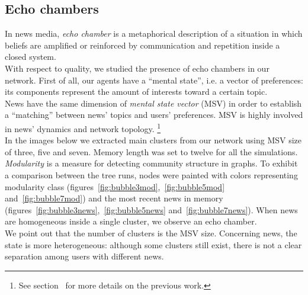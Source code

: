 \subsection{Echo chambers}
In news media, \textit{echo chamber} is a metaphorical description
of a situation in which beliefs are amplified or reinforced by
communication and repetition inside a closed
system.\cite{echochamwiki,echocham}\\
With respect to quality, we studied the presence of echo chambers
in our network.
First of all, our agents have a ``mental  state'', i.e. a vector of
preferences: its components represent the amount of interests toward
a certain topic.\\
News have the same dimension of \textit{mental state vector} (MSV)
in order to establish a ``matching'' between news' topics and users'
preferences.
MSV is highly involved in news' dynamics and network topology.
\footnote{See section~ for more
  details on the previous work.}\\
In the images below we extracted main clusters from our network using
MSV size of three, five and seven.
Memory length was set to twelve for all the simulations.\\
\textit{Modularity} is a measure for detecting community
structure in graphs.\cite{modulwiki}
To exhibit a comparison between the tree runs,
nodes were painted with colors representing modularity class
(figures~\ref{fig:bubble3mod},~\ref{fig:bubble5mod} and~\ref{fig:bubble7mod})
and the most recent news in memory
(figures~\ref{fig:bubble3news},~\ref{fig:bubble5news} and~\ref{fig:bubble7news}).
When news are homogeneous inside a single cluster, we observe
an echo chamber.\\
We point out that the number of clusters is the MSV size.
Concerning news, the state is more heterogeneous:
although some clusters still exist, there is not a clear separation
among users with different news.
%
